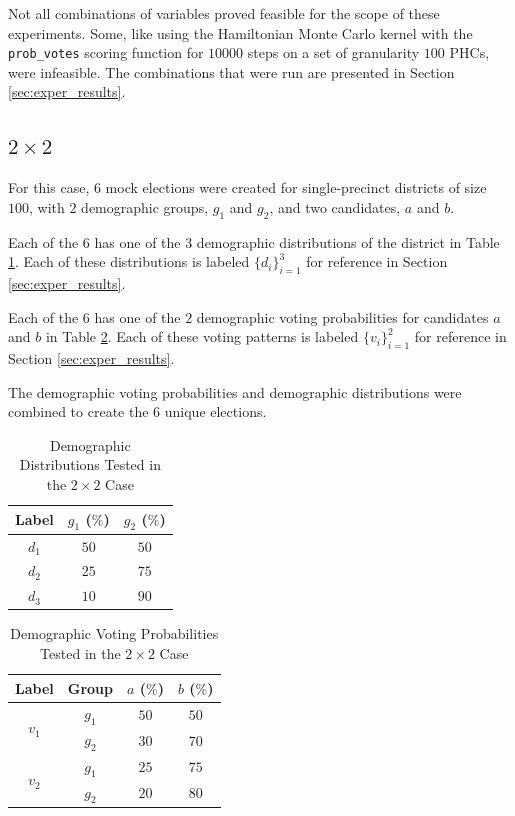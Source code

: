 Not all combinations of variables proved feasible for the scope of these experiments. Some, like using the Hamiltonian Monte Carlo kernel with the \texttt{prob\_votes} scoring function for $10000$ steps on a set of granularity $100$ PHCs, were infeasible. The combinations that were run are presented in Section \ref{sec:exper_results}.


\subsection{$2 \times 2$}
\label{subsec:two_by_two}

For this case, $6$ mock elections were created for single-precinct districts of size $100$, with $2$ demographic groups, $g_1$ and $g_2$, and two candidates, $a$ and $b$.

Each of the $6$ has one of the $3$ demographic distributions of the district in Table \ref{table:demo_dist}. Each of these distributions is labeled $\{d_i\}_{i=1}^3$ for reference in Section \ref{sec:exper_results}.

Each of the $6$ has one of the $2$ demographic voting probabilities for candidates $a$ and $b$ in Table \ref{table:voting}. Each of these voting patterns is labeled $\{v_i\}_{i=1}^2$ for reference in Section \ref{sec:exper_results}.

The demographic voting probabilities and demographic distributions were combined to create the $6$ unique elections.

\begin{table}[ht]
 \centering
 \caption{Demographic Distributions Tested in the $2 \times 2$ Case}
 \label{table:demo_dist}
 \begin{tabular}{|c|c|c|}
   \hline
   Label & $g_1$ ($\%$) & $g_2$ ($\%$) \\
   \hline
   $d_1$ & $50$ & $50$ \\
   $d_2$ & $25$ & $75$ \\
   $d_3$ & $10$ & $90$ \\
  \hline
 \end{tabular}
\end{table}

\begin{table}[ht]
 \centering
 \caption{Demographic Voting Probabilities Tested in the $2 \times 2$ Case}
 \label{table:voting}
 \begin{tabular}{|c|c|c|c|}
   \hline
   Label & Group & $a$ ($\%$) & $b$ ($\%$) \\
   \hline
   \multirow{2}{*}{$v_1$} & $g_1$ & $50$ & $50$ \\
   & $g_2$ & $30$ & $70$ \\
   \hline
   \multirow{2}{*}{$v_2$} & $g_1$ & $25$ & $75$ \\
   & $g_2$ & $20$ & $80$ \\
  \hline
 \end{tabular}
\end{table}

